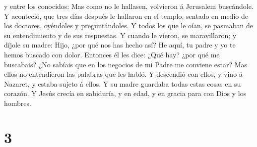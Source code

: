 y entre los conocidos:  Mas como no le hallasen,
volvieron á Jerusalem buscándole.  Y aconteció, que tres
días después le hallaron en el templo, sentado en medio de los doctores,
oyéndoles y preguntándoles.  Y todos los que le oían, se
pasmaban de su entendimiento y de sus respuestas.  Y
cuando le vieron, se maravillaron; y díjole su madre: Hijo, ¿por qué nos
has hecho así? He aquí, tu padre y yo te hemos buscado con dolor.
 Entonces él les dice: ¿Qué hay? ¿por qué me buscabais?
¿No sabíais que en los negocios de mi Padre me conviene estar?
 Mas ellos no entendieron las palabras que les habló.
 Y descendió con ellos, y vino á Nazaret, y estaba sujeto
á ellos. Y su madre guardaba todas estas cosas en su corazón.
 Y Jesús crecía en sabiduría, y en edad, y en gracia para
con Dios y los hombres.

\hypertarget{section-2}{%
\section{3}\label{section-2}}

